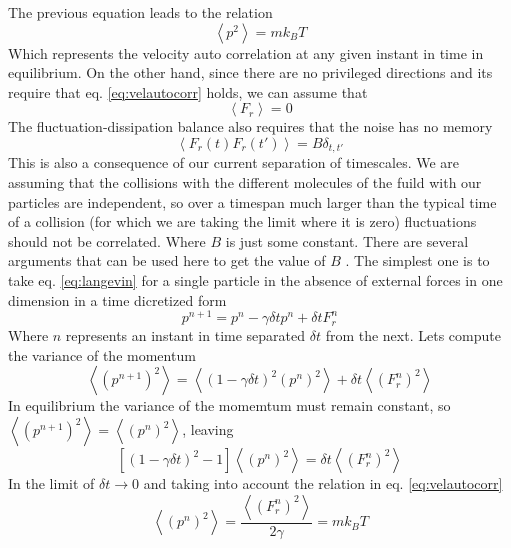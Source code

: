 \documentclass[ twoside,openright,titlepage,numbers=noenddot,%
headinclude,footinclude,cleardoublepage=empty,abstract=on,
BCOR=5mm,paper=a4,fontsize=11pt, dvipsnames
]{scrreprt}
\begin{document}
The previous equation leads to the relation
\begin{equation}
  \label{eq:velautocorr}
  \left\langle p^2\right\rangle = m k_BT
\end{equation}
Which represents the velocity auto correlation at any given instant in time in equilibrium.
On the other hand, since there are no privileged directions and its require that eq. \eqref{eq:velautocorr} holds, we can assume that
\begin{equation}
  \label{eq:noisemean}
  \left\langle F_r\right\rangle = 0
\end{equation}
The fluctuation-dissipation balance also requires that the noise has no memory
\begin{equation}
  \label{eq:noiseautocorr}
  \left\langle F_r(t)F_r(t')\right\rangle = B \delta_{t,t'}
\end{equation}
This is also a consequence of our current separation of timescales. We are assuming that the collisions with the different molecules of the fuild with our particles are independent, so over a timespan much larger than the typical time of a collision (for which we are taking the limit where it is zero) fluctuations should not be correlated.
Where $B$ is just some constant. There are several arguments that can be used here to get the value of $B$ \cite{allen}\cite{fokker}\cite{langevilsolve}. The simplest one is to take eq. \eqref{eq:langevin} for a single particle in the absence of external forces in one dimension in a time dicretized form
\begin{equation}
  p^{n+1} = p^n-\gamma\delta t p^n + \delta t F_r^n
\end{equation}
Where $n$ represents an instant in time separated $\delta t$ from the next. Lets compute the variance of the momentum
\begin{equation}
  \left\langle (p^{n+1})^2\right\rangle = \left\langle (1-\gamma \delta t)^2(p^n)^2\right\rangle + \delta t \left\langle (F_r^n)^2\right\rangle
\end{equation}
In equilibrium the variance of the momemtum must remain constant, so $\left\langle (p^{n+1})^2\right\rangle = \left\langle (p^{n})^2\right\rangle$, leaving
\begin{equation}
  \left[ (1-\gamma \delta t)^2 -1 \right]\left\langle (p^{n})^2\right\rangle = \delta t \left\langle (F_r^n)^2\right\rangle
\end{equation}
In the limit of $\delta t \rightarrow 0$ and taking into account the relation in eq. \eqref{eq:velautocorr}
\begin{equation}
  \left\langle (p^{n})^2\right\rangle = \frac{\left\langle (F_r^n)^2\right\rangle}{2\gamma} = mk_BT
\end{equation}
\end{document}
